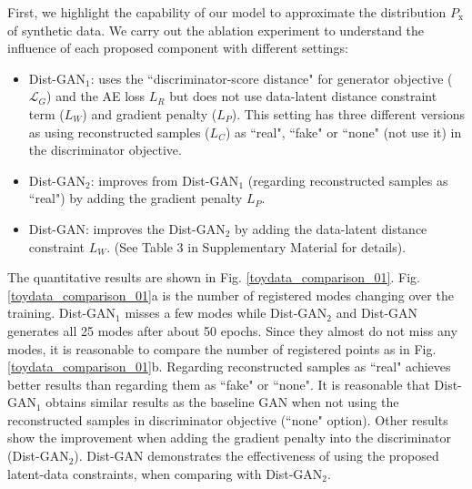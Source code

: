 \documentclass[runningheads]{llncs}
\begin{document}
First, we highlight the capability of our model to approximate the distribution $P_\mathrm{x}$ of synthetic data. We carry out the ablation experiment to understand the influence of each proposed component with different settings:
\begin{itemize}
\item Dist-GAN$_1$: uses the ``discriminator-score distance" for generator objective ($\mathcal{L}_G$) and the AE loss $L_R$ but does not use data-latent distance constraint term ($L_W$) and gradient penalty ($L_P$). This setting has three different versions as using reconstructed samples ($L_C$) as ``real", ``fake" or ``none" (not use it) in the discriminator objective. 
\item Dist-GAN$_2$: improves from Dist-GAN$_1$ (regarding reconstructed samples as ``real") by adding the gradient penalty $L_P$.
\item Dist-GAN: improves the Dist-GAN$_2$ by adding the data-latent distance constraint $L_W$. (See Table 3 in Supplementary Material for details).
\end{itemize}




The quantitative results are shown in Fig. \ref{toydata_comparison_01}. Fig. \ref{toydata_comparison_01}a is the number of registered modes changing over the training. Dist-GAN$_1$ misses a few modes while Dist-GAN$_2$ and Dist-GAN generates all 25 modes after about 50 epochs. Since they almost do not miss any modes, it is reasonable to compare the number of registered points as in Fig. \ref{toydata_comparison_01}b. Regarding reconstructed samples as ``real" achieves better results than regarding them as  ``fake" or ``none". 
It is reasonable that Dist-GAN$_1$ obtains similar results as the baseline GAN when not using the reconstructed samples in discriminator objective (``none" option). Other results show the improvement when adding the gradient penalty into the discriminator (Dist-GAN$_2$). Dist-GAN demonstrates the effectiveness of using the proposed latent-data constraints, when comparing with Dist-GAN$_2$. 
\end{document}
